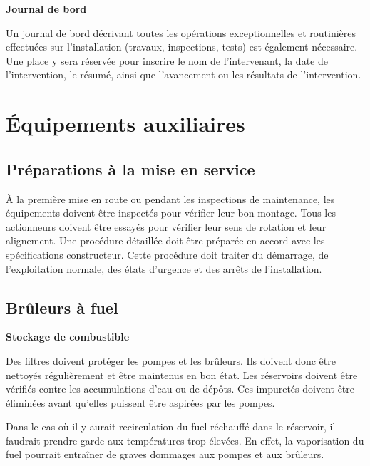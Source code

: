 \vspace{0.3cm}
\textbf{Journal de bord}
\vspace{0.3cm}

Un journal de bord décrivant toutes les opérations exceptionnelles et routinières effectuées sur l’installation (travaux, inspections, tests) est également nécessaire. Une place y sera réservée pour inscrire le nom de l’intervenant, la date de l’intervention, le résumé, ainsi que l’avancement ou les résultats de l’intervention.



\section{Équipements auxiliaires}

\subsection{Préparations à la mise en service}

À la première mise en route ou pendant les inspections de maintenance, les équipements doivent être inspectés pour vérifier leur bon montage. Tous les actionneurs doivent être essayés pour vérifier leur sens de rotation et leur alignement.
Une procédure détaillée doit être préparée en accord avec les spécifications constructeur. Cette procédure doit traiter du démarrage, de l’exploitation normale, des états d’urgence et des arrêts de l’installation.

\subsection{Brûleurs à fuel}

\vspace{0.3cm}
\textbf{Stockage de combustible}
\vspace{0.3cm}

Des filtres doivent protéger les pompes et les brûleurs. Ils doivent donc être nettoyés régulièrement et être maintenus en bon état.
Les réservoirs doivent être vérifiés contre les accumulations d’eau ou de dépôts. Ces impuretés doivent être éliminées avant qu’elles puissent être aspirées par les pompes.
\vspace{0.3cm}

Dans le cas où il y aurait recirculation du fuel réchauffé dans le réservoir, il faudrait prendre garde aux températures trop élevées. En effet, la vaporisation du fuel pourrait entraîner de graves dommages aux pompes et aux brûleurs.

